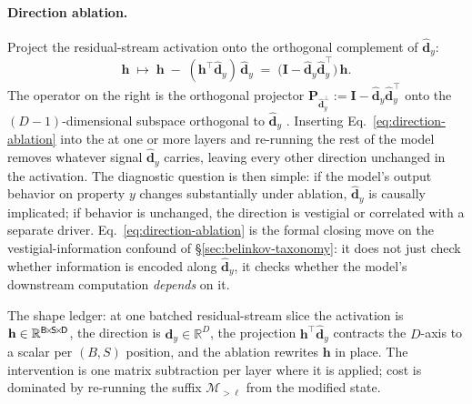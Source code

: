 \paragraph{Direction ablation.} Project the residual-stream activation
onto the orthogonal complement of $\hat{\mathbf{d}}_y$:
\begin{equation}
  \boxed{\;
  \mathbf{h} \;\mapsto\;
  \mathbf{h} \;-\; (\mathbf{h}^\top \hat{\mathbf{d}}_y)\,\hat{\mathbf{d}}_y
  \;=\; \big(\mathbf{I} - \hat{\mathbf{d}}_y \hat{\mathbf{d}}_y^\top\big)\,\mathbf{h}.
  \;}
  \label{eq:direction-ablation}
\end{equation}
The operator on the right is the orthogonal projector
$\mathbf{P}_{\hat{\mathbf{d}}_y^{\perp}} :=
\mathbf{I} - \hat{\mathbf{d}}_y \hat{\mathbf{d}}_y^{\top}$ onto the
$(D-1)$-dimensional subspace orthogonal to $\hat{\mathbf{d}}_y$
\citep{marks-tegmark-2023-truth}. Inserting Eq.~\eqref{eq:direction-ablation}
into the  at one or more layers and re-running the rest
of the model removes whatever signal $\hat{\mathbf{d}}_y$ carries,
leaving every other direction unchanged in the activation. The
diagnostic question is then simple: if the model's output behavior on
property $y$ changes substantially under ablation, $\hat{\mathbf{d}}_y$
is causally implicated; if behavior is unchanged, the direction is
vestigial or correlated with a separate driver. Eq.~\eqref{eq:direction-ablation}
is the formal closing move on the vestigial-information confound of
\S\ref{sec:belinkov-taxonomy}: it does not just check whether
information is encoded along $\hat{\mathbf{d}}_y$, it checks whether
the model's downstream computation \emph{depends} on it.

The shape ledger: at one batched residual-stream slice the activation
is $\mathbf{h} \in \mathbb{R}^{\mathsf{B}\!\times\!\mathsf{S}\!\times\!\mathsf{D}}$, the
direction is $\hat{\mathbf{d}}_y \in \mathbb{R}^D$, the projection
$\mathbf{h}^\top \hat{\mathbf{d}}_y$ contracts the $D$-axis to a
scalar per $(B, S)$ position, and the ablation rewrites $\mathbf{h}$
in place. The intervention is one matrix subtraction per layer where
it is applied; cost is dominated by re-running the suffix
$\mathcal{M}_{>\ell}$ from the modified state.

